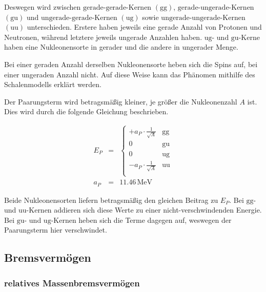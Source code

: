 \documentclass[12pt,a4paper]{scrartcl}
\numberwithin{equation}{section} %
\renewcommand{\[}{} %
\renewcommand{\]}{\noindent} %
\begin{document}
Deswegen wird zwischen \(\mathrm{gerade}\)-\(\mathrm{gerade}\)-Kernen
\((\mathrm{gg})\), \(\mathrm{gerade}\)-\(\mathrm{ungerade}\)-Kernen
\((\mathrm{gu})\) und \(\mathrm{ungerade}\)-\(\mathrm{gerade}\)-Kernen
\((\mathrm{ug})\) sowie
\(\mathrm{ungerade}\)-\(\mathrm{ungerade}\)-Kernen \((\mathrm{uu})\)
unterschieden. Erstere haben jeweils eine gerade Anzahl von Protonen und
Neutronen, während letztere jeweils ungerade Anzahlen haben.
\(\mathrm{ug}\)- und \(\mathrm{gu}\)-Kerne haben eine Nukleonensorte in
gerader und die andere in ungerader Menge.

Bei einer geraden Anzahl derselben Nukleonensorte heben sich die Spins
auf, bei einer ungeraden Anzahl nicht. Auf diese Weise kann das Phänomen
mithilfe des Schalenmodells erklärt werden.

Der Paarungsterm wird betragsmäßig kleiner, je größer die Nukleonenzahl
\(A\) ist. Dies wird durch die folgende Gleichung beschrieben.

\[
\begin{eqnarray}
    E_P &=&
        \begin{cases}
            + a_P\cdot \frac{1}{\sqrt{A}} & \text{gg} \\
            0 & \text{gu} \\
            0 & \text{ug} \\
            - a_P\cdot \frac{1}{\sqrt{A}} & \text{uu} \\
        \end{cases}
        \label{Paarungsterm} \\
    a_P &=& 11.46\mathrm{\,MeV}
\end{eqnarray}
\]

Beide Nukleonensorten liefern betragsmäßig den gleichen Beitrag zu
\(E_P\). Bei \(\mathrm{gg}\)- und \(\mathrm{uu}\)-Kernen addieren sich
diese Werte zu einer nicht-verschwindenden Energie. Bei \(\mathrm{gu}\)-
und \(\mathrm{ug}\)-Kernen heben sich die Terme dagegen auf, weswegen
der Paarungsterm hier verschwindet.

\hypertarget{bremsvermuxf6gen}{%
\subsection{Bremsvermögen}\label{bremsvermuxf6gen}}


\hypertarget{relatives-massenbremsvermuxf6gen}{%
	\subsubsection{relatives
		Massenbremsvermögen}\label{relatives-massenbremsvermuxf6gen}}
\end{document}
